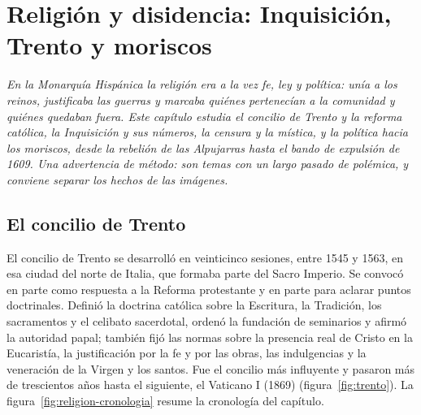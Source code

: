 \documentclass{book}
\begin{document}
\chapter{Religión y disidencia: Inquisición, Trento y moriscos}
\label{chap:hist-10}

\noindent\textit{En la Monarquía Hispánica la religión era a la vez fe, ley y política: unía a los reinos, justificaba las guerras y marcaba quiénes pertenecían a la comunidad y quiénes quedaban fuera. Este capítulo estudia el concilio de Trento y la reforma católica, la Inquisición y sus números, la censura y la mística, y la política hacia los moriscos, desde la rebelión de las Alpujarras hasta el bando de expulsión de 1609. Una advertencia de método: son temas con un largo pasado de polémica, y conviene separar los hechos de las imágenes.}


\section{El concilio de Trento}

El concilio de Trento se desarrolló en veinticinco sesiones, entre 1545 y 1563, en esa ciudad del norte de Italia, que formaba parte del Sacro Imperio. Se convocó en parte como respuesta a la Reforma protestante y en parte para aclarar puntos doctrinales. Definió la doctrina católica sobre la Escritura, la Tradición, los sacramentos y el celibato sacerdotal, ordenó la fundación de seminarios y afirmó la autoridad papal; también fijó las normas sobre la presencia real de Cristo en la Eucaristía, la justificación por la fe y por las obras, las indulgencias y la veneración de la Virgen y los santos. Fue el concilio más influyente y pasaron más de trescientos años hasta el siguiente, el Vaticano I (1869) (figura~\ref{fig:trento}). La figura~\ref{fig:religion-cronologia} resume la cronología del capítulo.

\end{document}
